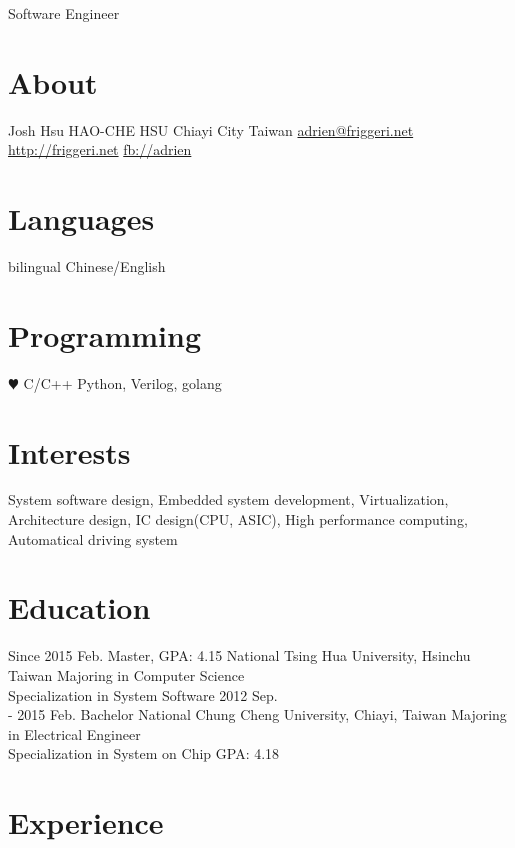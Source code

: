 \documentclass[]{friggeri-cv}
\begin{document}
       {Software Engineer}


\begin{aside}
  \section{About}
    Josh Hsu
    HAO-CHE HSU
	Chiayi City
    Taiwan
    \href{mailto:adrien@friggeri.net}{adrien@friggeri.net}
    \href{http://friggeri.net}{http://friggeri.net}
    \href{http://facebook.com/adrien}{fb://adrien}
  \section{Languages}
    bilingual Chinese/English
  \section{Programming}
    {\color{red} $\varheartsuit$} C/C++
    Python, Verilog, golang
\end{aside}

\section{Interests}

System software design, Embedded system development,
Virtualization, Architecture design, IC design(CPU, ASIC), 
High performance computing, Automatical driving system
\section{Education}

\begin{entrylist}
  \entry
    {Since 2015 Feb.}
    {Master, GPA: 4.15}
    {National Tsing Hua University, Hsinchu Taiwan}
	{Majoring in Computer Science \\
	Specialization in System Software}
  \entry
    {2012 Sep. \\
	- 2015 Feb.}
    {Bachelor}
    {National Chung Cheng University, Chiayi, Taiwan}
	{Majoring in Electrical Engineer \\
	Specialization in System on Chip}
	{GPA: 4.18}
\end{entrylist}

\section{Experience}
\end{document}
